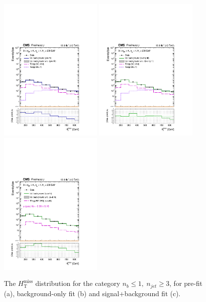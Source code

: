 \clearpage
\begin{figure}[tbhp]
    \caption{ 
    The $H_{\mathrm{T}}^{\mathrm{miss}}$ distribution for the category $n_{b}\leq 1, \; n_{jet} \geq 3$, for pre-fit (a), background-only fit (b) and signal+background fit (c).
    \label{fig:mhtShape_le1b_ge3j} }
  \begin{center}
  \includegraphics[width=0.45\textwidth]{mhtShape_le1b_ge3j_200_Inf_prefit_aux} \hspace{1cm}
  \includegraphics[width=0.45\textwidth]{mhtShape_le1b_ge3j_200_Inf_fit_b_aux} \\
  \includegraphics[width=0.45\textwidth]{mhtShape_le1b_ge3j_200_Inf_fit_s_aux}
  \end{center}
\end{figure}


